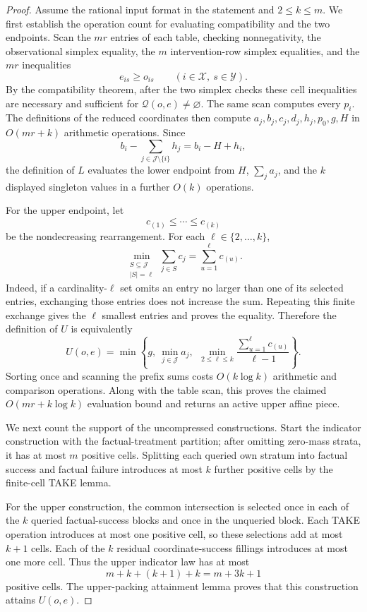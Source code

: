 \documentclass{article}
\begin{document}
\begin{proof}
Assume the rational input format in the statement and \(2\leq k\leq m\).  We first establish the operation count for evaluating compatibility and the two endpoints.  Scan the \(mr\) entries of each table, checking nonnegativity, the observational simplex equality, the \(m\) intervention-row simplex equalities, and the \(mr\) inequalities
\[
e_{is}\geq o_{is}
\qquad(i\in\mathcal X,\ s\in\mathcal Y).
\]
By the compatibility theorem, after the two simplex checks these cell inequalities are necessary and sufficient for \(\mathcal Q(o,e)\neq\varnothing\).  The same scan computes every \(p_i\).  The definitions of the reduced coordinates then compute \(a_j,b_j,c_j,d_j,h_j,p_0,g,H\) in \(O(mr+k)\) arithmetic operations.  Since
\[
b_i-\sum_{j\in\mathcal J\setminus\{i\}}h_j=b_i-H+h_i,
\]
the definition of \(L\) evaluates the lower endpoint from \(H\), \(\sum_j a_j\), and the \(k\) displayed singleton values in a further \(O(k)\) operations.

For the upper endpoint, let
\[
c_{(1)}\leq\cdots\leq c_{(k)}
\]
be the nondecreasing rearrangement.  For each \(\ell\in\{2,\ldots,k\}\),
\[
\min_{\substack{S\subseteq\mathcal J\\ |S|=\ell}}
\sum_{j\in S}c_j
=\sum_{u=1}^{\ell}c_{(u)}.
\]
Indeed, if a cardinality-\(\ell\) set omits an entry no larger than one of its selected entries, exchanging those entries does not increase the sum.  Repeating this finite exchange gives the \(\ell\) smallest entries and proves the equality.  Therefore the definition of \(U\) is equivalently
\[
U(o,e)=\min\left\{g,\ \min_{j\in\mathcal J}a_j,\
\ \min_{2\leq\ell\leq k}
\frac{\sum_{u=1}^{\ell}c_{(u)}}{\ell-1}\right\}.
\]
Sorting once and scanning the prefix sums costs \(O(k\log k)\) arithmetic and comparison operations.  Along with the table scan, this proves the claimed \(O(mr+k\log k)\) evaluation bound and returns an active upper affine piece.

We next count the support of the uncompressed constructions.  Start the indicator construction with the factual-treatment partition; after omitting zero-mass strata, it has at most \(m\) positive cells.  Splitting each queried own stratum into factual success and factual failure introduces at most \(k\) further positive cells by the finite-cell TAKE lemma.

For the upper construction, the common intersection is selected once in each of the \(k\) queried factual-success blocks and once in the unqueried block.  Each TAKE operation introduces at most one positive cell, so these selections add at most \(k+1\) cells.  Each of the \(k\) residual coordinate-success fillings introduces at most one more cell.  Thus the upper indicator law has at most
\[
m+k+(k+1)+k=m+3k+1
\]
positive cells.  The upper-packing attainment lemma proves that this construction attains \(U(o,e)\).


\end{proof}
\end{document}
